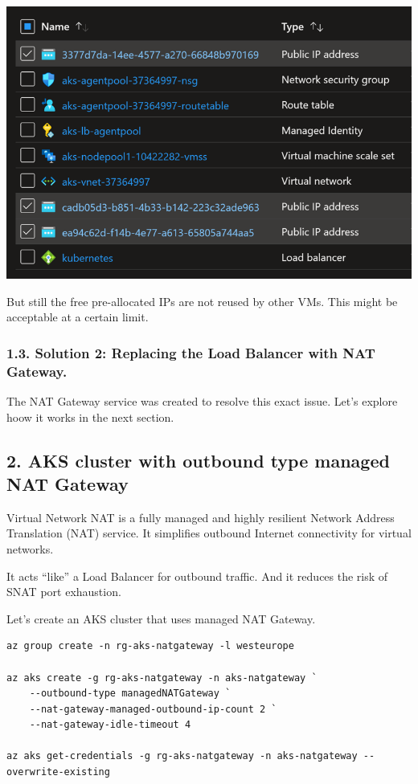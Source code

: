 \documentclass[
]{article}
\begin{document}
\includegraphics{images/65_aks_egress_lb_natgw_udr__lb-pip-egress-scale.png}

But still the free pre-allocated IPs are not reused by other VMs. This
might be acceptable at a certain limit.

\hypertarget{solution-2-replacing-the-load-balancer-with-nat-gateway.}{%
\subsubsection{1.3. Solution 2: Replacing the Load Balancer with NAT
Gateway.}\label{solution-2-replacing-the-load-balancer-with-nat-gateway.}}

The NAT Gateway service was created to resolve this exact issue. Let's
explore hoow it works in the next section.

\hypertarget{aks-cluster-with-outbound-type-managed-nat-gateway}{%
\subsection{2. AKS cluster with outbound type managed NAT
Gateway}\label{aks-cluster-with-outbound-type-managed-nat-gateway}}

Virtual Network NAT is a fully managed and highly resilient Network
Address Translation (NAT) service. It simplifies outbound Internet
connectivity for virtual networks.

It acts ``like'' a Load Balancer for outbound traffic. And it reduces
the risk of SNAT port exhaustion.

Let's create an AKS cluster that uses managed NAT Gateway.

\begin{lstlisting}
az group create -n rg-aks-natgateway -l westeurope

az aks create -g rg-aks-natgateway -n aks-natgateway `
    --outbound-type managedNATGateway `
    --nat-gateway-managed-outbound-ip-count 2 `
    --nat-gateway-idle-timeout 4

az aks get-credentials -g rg-aks-natgateway -n aks-natgateway --overwrite-existing
\end{lstlisting}
\end{document}
